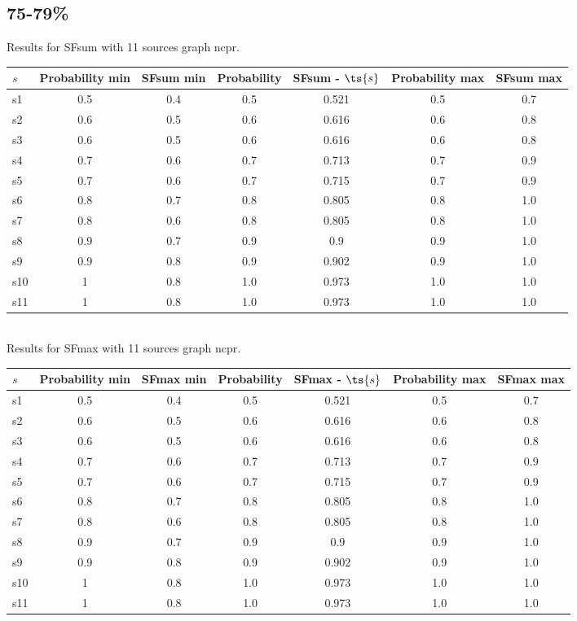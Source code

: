 \documentclass{article}
\begin{document}
\newpage

\subsection{75-79\%}

\noindent Results for SFsum with 11 sources graph ncpr.

\noindent\begin{tabular}{|l|c|c|c|c|c|c|}
\hline
$s$& Probability min & SFsum min & Probability & SFsum - $\ts{s}$ & Probability max & SFsum max\\
\hline
s1 &0.5 & 0.4 & 0.5 & 0.521 & 0.5 & 0.7\\
\hline
s2 &0.6 & 0.5 & 0.6 & 0.616 & 0.6 & 0.8\\
\hline
s3 &0.6 & 0.5 & 0.6 & 0.616 & 0.6 & 0.8\\
\hline
s4 &0.7 & 0.6 & 0.7 & 0.713 & 0.7 & 0.9\\
\hline
s5 &0.7 & 0.6 & 0.7 & 0.715 & 0.7 & 0.9\\
\hline
s6 &0.8 & 0.7 & 0.8 & 0.805 & 0.8 & 1.0\\
\hline
s7 &0.8 & 0.6 & 0.8 & 0.805 & 0.8 & 1.0\\
\hline
s8 &0.9 & 0.7 & 0.9 & 0.9 & 0.9 & 1.0\\
\hline
s9 &0.9 & 0.8 & 0.9 & 0.902 & 0.9 & 1.0\\
\hline
s10 &1 & 0.8 & 1.0 & 0.973 & 1.0 & 1.0\\
\hline
s11 &1 & 0.8 & 1.0 & 0.973 & 1.0 & 1.0\\
\hline
\end{tabular}\\

\noindent Results for SFmax with 11 sources graph ncpr.

\noindent\begin{tabular}{|l|c|c|c|c|c|c|}
\hline
$s$& Probability min & SFmax min & Probability & SFmax - $\ts{s}$ & Probability max & SFmax max\\
\hline
s1 &0.5 & 0.4 & 0.5 & 0.521 & 0.5 & 0.7\\
\hline
s2 &0.6 & 0.5 & 0.6 & 0.616 & 0.6 & 0.8\\
\hline
s3 &0.6 & 0.5 & 0.6 & 0.616 & 0.6 & 0.8\\
\hline
s4 &0.7 & 0.6 & 0.7 & 0.713 & 0.7 & 0.9\\
\hline
s5 &0.7 & 0.6 & 0.7 & 0.715 & 0.7 & 0.9\\
\hline
s6 &0.8 & 0.7 & 0.8 & 0.805 & 0.8 & 1.0\\
\hline
s7 &0.8 & 0.6 & 0.8 & 0.805 & 0.8 & 1.0\\
\hline
s8 &0.9 & 0.7 & 0.9 & 0.9 & 0.9 & 1.0\\
\hline
s9 &0.9 & 0.8 & 0.9 & 0.902 & 0.9 & 1.0\\
\hline
s10 &1 & 0.8 & 1.0 & 0.973 & 1.0 & 1.0\\
\hline
s11 &1 & 0.8 & 1.0 & 0.973 & 1.0 & 1.0\\
\hline
\end{tabular}\\
\end{document}
